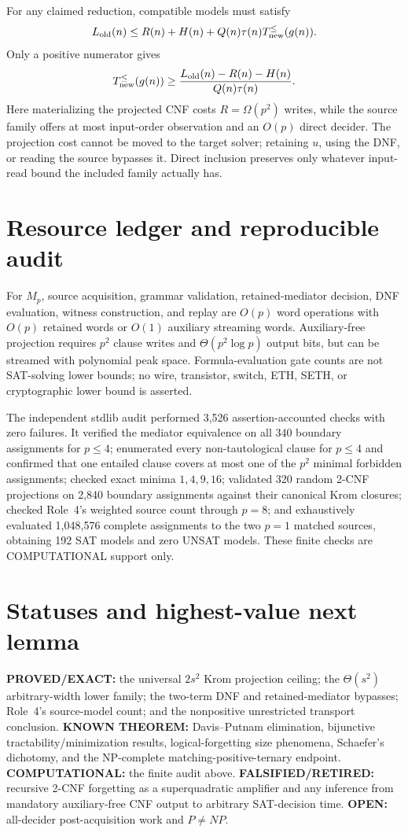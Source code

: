 \documentclass[11pt]{article}
\begin{document}
For any claimed reduction, compatible models must satisfy
\[
L_{\rm old}(n)\le R(n)+H(n)+Q(n)\tau(n)T_{\rm new}^{\le}(g(n)).
\]
Only a positive numerator gives
\[
T_{\rm new}^{\le}(g(n))\ge
\frac{L_{\rm old}(n)-R(n)-H(n)}{Q(n)\tau(n)}.
\]
Here materializing the projected CNF costs $R=\Omega(p^2)$ writes, while the source family offers at most input-order observation and an $O(p)$ direct decider. The projection cost cannot be moved to the target solver; retaining $u$, using the DNF, or reading the source bypasses it. Direct inclusion preserves only whatever input-read bound the included family actually has.

\section{Resource ledger and reproducible audit}
For $M_p$, source acquisition, grammar validation, retained-mediator decision, DNF evaluation, witness construction, and replay are $O(p)$ word operations with $O(p)$ retained words or $O(1)$ auxiliary streaming words. Auxiliary-free projection requires $p^2$ clause writes and $\Theta(p^2\log p)$ output bits, but can be streamed with polynomial peak space. Formula-evaluation gate counts are not SAT-solving lower bounds; no wire, transistor, switch, ETH, SETH, or cryptographic lower bound is asserted.

The independent stdlib audit performed 3,526 assertion-accounted checks with zero failures. It verified the mediator equivalence on all 340 boundary assignments for $p\le4$; enumerated every non-tautological clause for $p\le4$ and confirmed that one entailed clause covers at most one of the $p^2$ minimal forbidden assignments; checked exact minima $1,4,9,16$; validated 320 random 2-CNF projections on 2,840 boundary assignments against their canonical Krom closures; checked Role~4's weighted source count through $p=8$; and exhaustively evaluated 1,048,576 complete assignments to the two $p=1$ matched sources, obtaining 192 SAT models and zero UNSAT models. These finite checks are COMPUTATIONAL support only.

\section{Statuses and highest-value next lemma}
\textbf{PROVED/EXACT:} the universal $2s^2$ Krom projection ceiling; the $\Theta(s^2)$ arbitrary-width lower family; the two-term DNF and retained-mediator bypasses; Role~4's source-model count; and the nonpositive unrestricted transport conclusion. \textbf{KNOWN THEOREM:} Davis--Putnam elimination, bijunctive tractability/minimization results, logical-forgetting size phenomena, Schaefer's dichotomy, and the NP-complete matching-positive-ternary endpoint. \textbf{COMPUTATIONAL:} the finite audit above. \textbf{FALSIFIED/RETIRED:} recursive 2-CNF forgetting as a superquadratic amplifier and any inference from mandatory auxiliary-free CNF output to arbitrary SAT-decision time. \textbf{OPEN:} all-decider post-acquisition work and $P\ne NP$.
\end{document}
